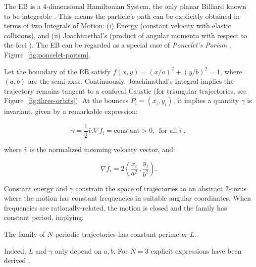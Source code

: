 The EB is a 4-dimensional Hamiltonian System, the only planar Billiard known to be integrable \cite{jovanovic11}. This means the particle's path can be explicitly obtained in terms of two Integrals of Motion: (i) Energy (constant velocity with elastic collisions), and (ii) Joachimsthal's (product of angular momenta with respect to the foci \cite{birkhoff1927,sergei91}). The EB can be regarded as a special case of {\em Poncelet's Porism} \cite{dragovic11},  Figure~\ref{fig:poncelet-porism}.

Let the boundary of the EB satisfy $f(x,y)=(x/a)^2+(y/b)^2=1$, where $(a,b)$ are the semi-axes. Continuously, Joachimsthal's Integral implies the trajectory remains tangent to a confocal Caustic (for triangular trajectories, see Figure~\ref{fig:three-orbits}). At the bounces $P_i=(x_i,y_i)$, it implies a quantity $\gamma$ is invariant, given by a remarkable expression:

%
\begin{equation}
 \gamma=\frac{1}{2}\hat{v}.\nabla{f_i}=\mbox{constant} >0,\,\,\,\mbox{for all }{i}\;,
 \label{eqn:joachim}
\end{equation}

\noindent where $\hat{v}$ is the normalized incoming velocity vector, and:

\begin{equation}
\nabla{f_i}=2\left(\frac{x_i}{a^2}\,,\frac{y_i}{b^2}\right).
\label{eqn:f}
\end{equation}

Constant energy and $\gamma$ constrain the space of trajectories to an abstract 2-torus \cite{sergei91} where the motion has constant frequencies in suitable angular coordinates. When frequencies are rationally-related, the motion is closed and the family has constant period, implying:

\begin{property}
The family of $N$-periodic trajectories has constant perimeter $L$.
\end{property}

Indeed, $L$ and $\gamma$ only depend on $a,b$. For $N=3$ explicit expressions have been derived \cite{ronaldo19,ronaldo19a}.